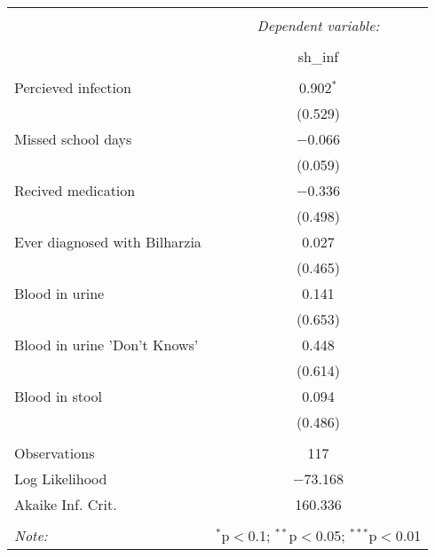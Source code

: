 
\begin{table}[!htbp] \centering 
  \caption{} 
  \label{} 
\begin{tabular}{@{\extracolsep{3pt}}lc} 
\\[-1.8ex]\hline 
\hline \\[-1.8ex] 
 & \multicolumn{1}{c}{\textit{Dependent variable:}} \\ 
\cline{2-2} 
\\[-1.8ex] & sh\_inf \\ 
\hline \\[-1.8ex] 
 Percieved infection & 0.902$^{*}$ \\ 
  & (0.529) \\ 
  Missed school days & $-$0.066 \\ 
  & (0.059) \\ 
  Recived medication & $-$0.336 \\ 
  & (0.498) \\ 
  Ever diagnosed with Bilharzia & 0.027 \\ 
  & (0.465) \\ 
  Blood in urine & 0.141 \\ 
  & (0.653) \\ 
  Blood in urine 'Don't Knows' & 0.448 \\ 
  & (0.614) \\ 
  Blood in stool & 0.094 \\ 
  & (0.486) \\ 
 \hline \\[-1.8ex] 
Observations & 117 \\ 
Log Likelihood & $-$73.168 \\ 
Akaike Inf. Crit. & 160.336 \\ 
\hline 
\hline \\[-1.8ex] 
\textit{Note:}  & \multicolumn{1}{r}{$^{*}$p$<$0.1; $^{**}$p$<$0.05; $^{***}$p$<$0.01} \\ 
\end{tabular} 
\end{table} 

